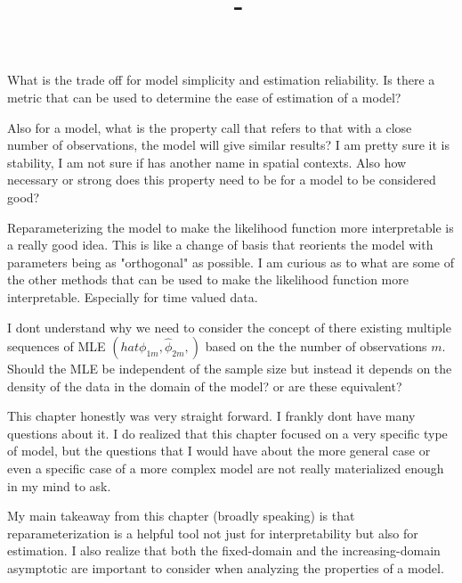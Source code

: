 \documentclass[answers,12pt,addpoints]{exam}
\author{\name}
\title{\course \ - \assignment}
\begin{document}
\maketitle

\newpage
\begin{questions}
\question What is the trade off for model simplicity and estimation reliability. Is there a metric that can be used to determine the ease of estimation of a model?

\question Also for a model, what is the property call that refers to that with a close number of observations, the model will give similar results? I am pretty sure it is stability, I am not sure if has another name in spatial contexts. Also how necessary or strong does this property need to be for a model to be considered good?

\question Reparameterizing the model to make the likelihood function more interpretable is a really good idea. This is like a change of basis that reorients the model with parameters being as "orthogonal" as possible. I am curious as to what are some of the other methods that can be used to make the likelihood function more interpretable. Especially for time valued data.

\question I dont understand why we need to consider the concept of there existing multiple sequences of MLE $(hat \phi_{1m}, \hat \phi_{2m}, )$ based on the the number of observations $m$. Should the MLE be independent of the sample size but instead it depends on the density of the data in the domain of the model? or are these equivalent? 

\question This chapter honestly was very straight forward. I frankly dont have many questions about it. I do realized that this chapter focused on a very specific type of model, but the questions that I would have about the more general case or even a specific case of a more complex model are not really materialized enough in my mind to ask.

\question My main takeaway from this chapter (broadly speaking) is that reparameterization is a helpful tool not just for interpretability but also for estimation. I also realize that both the fixed-domain and the increasing-domain asymptotic are important to consider when analyzing the properties of a model. 

\end{questions}
\end{document}
